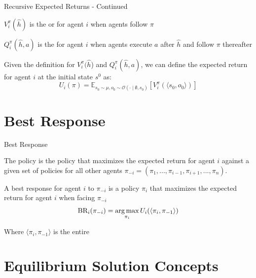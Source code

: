 \begin{frame}{Recursive Expected Returns - Continued}

    \blist
        \item \(V^{\pi}_i(\hat{h})\) is the  or  for agent \(i\) when agents follow  \(\pi\)
        \item \(Q^{\pi}_i(\hat{h}, a)\) is the  for agent \(i\) when agents execute  \(a\) after \(\hat{h}\) and follow \(\pi\) thereafter
        \item Given the definition for \(V^{\pi}_i(\hat{h}\)) and  \(Q^{\pi}_i(\hat{h}, a)\), we can define the expected return for agent \(i\) at the initial state \(s^0\) as:
    \elist
    \vspace{2pt}
    \[
    U_i(\pi) = \mathbb{E}_{s_0 \sim \mu, o_0 \sim \mathcal{O}(\cdot \mid \emptyset,  s_0)} \left[ V^{\pi}_i(\langle s_0, o_0 \rangle) \right]
    \]
    
\end{frame}

\section{Best Response}

\begin{frame}{Best Response}

    The  policy is the policy that maximizes the expected return for agent \(i\) against a given set of policies for all other agents \(\pi_{-i} = (\pi_1, ..., \pi_{i-1}, \pi_{i+1}, ..., \pi_{n})\).

    \blist
        \item  A best response for agent \(i\) to \(\pi_{-i}\) is a policy \(\pi_i\) that maximizes the expected return for agent \(i\) when facing \(\pi_{-i}\)
    \elist
    \vspace{2pt}
    \[
        \text{BR}_i(\pi_{-i}) = \operatorname*{arg\,max}_{\pi_{i}} U_i(\langle\pi_i, \pi_{-1}\rangle)
    \]

    \blist
        \item Where $\langle\pi_i, \pi_{-1}\rangle$ is the entire 
    \elist
    
\end{frame}

\section{Equilibrium Solution Concepts}

